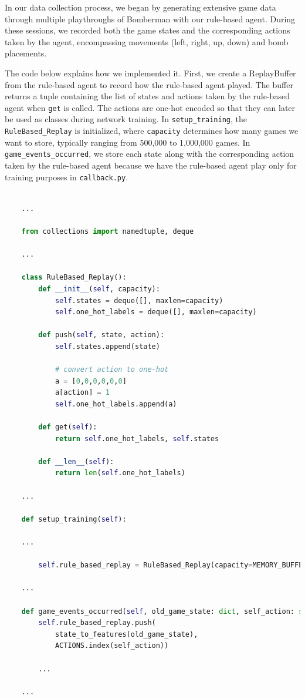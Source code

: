 In our data collection process, we began by generating extensive game data through multiple playthroughs of Bomberman with 
our rule-based agent. During these sessions, we recorded both the game states and the corresponding actions taken by the agent, 
encompassing movements (left, right, up, down) and bomb placements.

The code below explains how we implemented it. First, we create a ReplayBuffer~\cite{Onl:replaybuff} from the rule-based agent 
to record how the rule-based agent played. The buffer returns a tuple containing the list of states and actions 
taken by the rule-based agent when \verb|get| is called. The actions are one-hot encoded so that they can later be used as 
classes during network training. In \verb|setup_training|, the \verb|RuleBased_Replay| is initialized, where \verb|capacity| determines 
how many games we want to store, typically ranging from 500,000 to 1,000,000 games. In \verb|game_events_occurred|, 
we store each state along with the corresponding action taken by the rule-based agent because we have the 
rule-based agent play only for training purposes in \verb|callback.py|.

\begin{lstlisting}[language=Python]
    
    ...

    from collections import namedtuple, deque

    ...

    class RuleBased_Replay():
        def __init__(self, capacity):
            self.states = deque([], maxlen=capacity)
            self.one_hot_labels = deque([], maxlen=capacity)

        def push(self, state, action):
            self.states.append(state)

            # convert action to one-hot
            a = [0,0,0,0,0,0]
            a[action] = 1
            self.one_hot_labels.append(a)

        def get(self):
            return self.one_hot_labels, self.states

        def __len__(self):
            return len(self.one_hot_labels)
        
    ...

    def setup_training(self):

    ...

        self.rule_based_replay = RuleBased_Replay(capacity=MEMORY_BUFFER)
    
    ...

    def game_events_occurred(self, old_game_state: dict, self_action: str, new_game_state: dict, events: List[str]):
        self.rule_based_replay.push(
            state_to_features(old_game_state), 
            ACTIONS.index(self_action))
        
        ...
    
    ...
    
\end{lstlisting}

